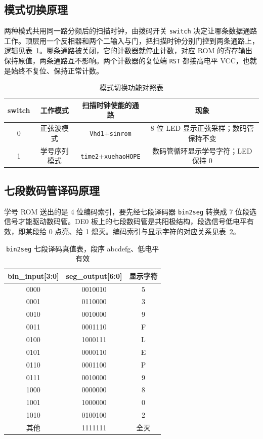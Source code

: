 \documentclass[12pt]{ctexart}
\begin{document}
\subsection{模式切换原理}

两种模式共用同一路分频后的扫描时钟，由拨码开关 \texttt{switch} 决定让哪条数据通路工作。顶层用一个反相器和两个二输入与门，把扫描时钟分别门控到两条通路上，逻辑见表~\ref{tab:mode}。哪条通路被关闭，它的计数器就停止计数，对应 ROM 的寄存输出保持原值，两条通路互不影响。两个计数器的复位端 \texttt{RST} 都接高电平 VCC，也就是始终不复位、保持正常计数。

\begin{table}[H]
    \centering
    \caption{模式切换功能对照表}
    \label{tab:mode}
    \begin{tabular}{cccc}
        \toprule
        \textbf{switch} & \textbf{工作模式} & \textbf{扫描时钟使能的通路} & \textbf{现象} \\
        \midrule
        0 & 正弦波模式   & \texttt{Vhd1}+\texttt{sinrom}     & 8 位 LED 显示正弦采样；数码管保持不变 \\
        1 & 学号序列模式 & \texttt{time2}+\texttt{xuehaoHOPE} & 数码管循环显示学号字符；LED 保持 0 \\
        \bottomrule
    \end{tabular}
\end{table}

\subsection{七段数码管译码原理}

学号 ROM 送出的是 4 位编码索引，要先经七段译码器 \texttt{bin2seg} 转换成 7 位段选信号才能驱动数码管。DE0 板上的七段数码管是共阳极结构，段选信号低电平有效，即某段给 0 点亮、给 1 熄灭。编码索引与显示字符的对应关系见表~\ref{tab:bin2seg}。

\begin{table}[H]
    \centering
    \caption{\texttt{bin2seg} 七段译码真值表，段序 abcdefg、低电平有效}
    \label{tab:bin2seg}
    \begin{tabular}{ccc}
        \toprule
        \textbf{bin\_input[3:0]} & \textbf{seg\_output[6:0]} & \textbf{显示字符} \\
        \midrule
        0000 & 0010010 & 5 \\
        0001 & 0110000 & 3 \\
        0010 & 0010000 & 9 \\
        0011 & 0001110 & F \\
        0100 & 1000111 & L \\
        0101 & 0000110 & E \\
        0110 & 0001100 & P \\
        0111 & 0010000 & 9 \\
        1000 & 0000000 & 8 \\
        1001 & 1000000 & 0 \\
        1010 & 0100100 & 2 \\
        其他 & 1111111 & 全灭 \\
        \bottomrule
    \end{tabular}
\end{table}
\end{document}

